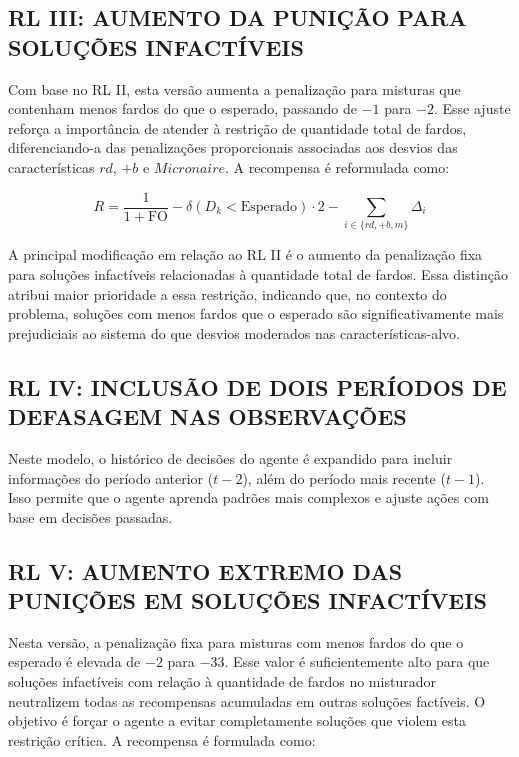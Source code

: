 \documentclass[
    12pt,                %
    openright,           %
    oneside,             %
    a4paper,             %
    english,             %
    spanish,             %
    brazil               %
]{ufscar}
\begin{document}
\subsection{RL III: AUMENTO DA PUNIÇÃO PARA SOLUÇÕES INFACTÍVEIS}

Com base no RL II, esta versão aumenta a penalização para misturas que contenham menos fardos do que o esperado, passando de \(-1\) para \(-2\). Esse ajuste reforça a importância de atender à restrição de quantidade total de fardos, diferenciando-a das penalizações proporcionais associadas aos desvios das características \(rd\), \(+b\) e \(Micronaire\). A recompensa é reformulada como:

\begin{equation}
R = \frac{1}{1 + \text{FO}} - \delta(D_k < \text{Esperado}) \cdot 2 - \sum_{i \in \{rd, +b, m\}} \Delta_i
\end{equation}

A principal modificação em relação ao RL II é o aumento da penalização fixa para soluções infactíveis relacionadas à quantidade total de fardos. Essa distinção atribui maior prioridade a essa restrição, indicando que, no contexto do problema, soluções com menos fardos que o esperado são significativamente mais prejudiciais ao sistema do que desvios moderados nas características-alvo. 

\subsection{RL IV: INCLUSÃO DE DOIS PERÍODOS DE DEFASAGEM NAS OBSERVAÇÕES}

Neste modelo, o histórico de decisões do agente é expandido para incluir informações do período anterior (\(t-2\)), além do período mais recente (\(t-1\)). Isso permite que o agente aprenda padrões mais complexos e ajuste ações com base em decisões passadas. 

\subsection{RL V: AUMENTO EXTREMO DAS PUNIÇÕES EM SOLUÇÕES INFACTÍVEIS}

Nesta versão, a penalização fixa para misturas com menos fardos do que o esperado é elevada de \(-2\) para \(-33\). Esse valor é suficientemente alto para que soluções infactíveis com relação à quantidade de fardos no misturador neutralizem todas as recompensas acumuladas em outras soluções factíveis. O objetivo é forçar o agente a evitar completamente soluções que violem esta restrição crítica. A recompensa é formulada como:
\end{document}

